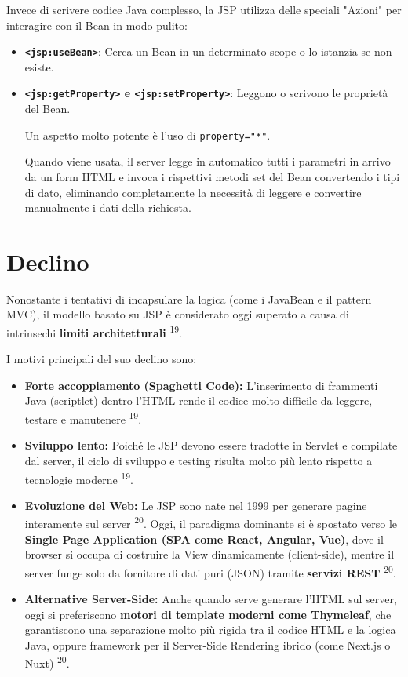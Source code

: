 Invece di scrivere codice Java complesso, la JSP utilizza delle speciali "Azioni" per interagire con il Bean in modo pulito:

\begin{itemize}
    \item \textbf{\texttt{<jsp:useBean>}}: Cerca un Bean in un determinato scope o lo istanzia se non esiste.
    \item \textbf{\texttt{<jsp:getProperty>} e \texttt{<jsp:setProperty>}}: Leggono o scrivono le proprietà del Bean.
    
    Un aspetto molto potente è l'uso di \texttt{property="*"}.
    
    Quando viene usata, il server legge in automatico tutti i parametri in arrivo da un form HTML e invoca i rispettivi metodi set del Bean convertendo i tipi di dato, eliminando completamente la necessità di leggere e convertire manualmente i dati della richiesta.
\end{itemize}

\section{Declino}
Nonostante i tentativi di incapsulare la logica (come i JavaBean e il pattern MVC), il modello basato su JSP è considerato oggi superato a causa di intrinsechi \textbf{limiti architetturali} \textsuperscript{19}.

I motivi principali del suo declino sono:

\begin{itemize}
    \item \textbf{Forte accoppiamento (Spaghetti Code):} 
    L'inserimento di frammenti Java (scriptlet) dentro l'HTML rende il codice molto difficile da leggere, testare e manutenere \textsuperscript{19}.
    \item \textbf{Sviluppo lento:} Poiché le JSP devono essere tradotte in Servlet e compilate dal server, il ciclo di sviluppo e testing risulta molto più lento rispetto a tecnologie moderne \textsuperscript{19}.
    \item \textbf{Evoluzione del Web:} Le JSP sono nate nel 1999 per generare pagine interamente sul server \textsuperscript{20}. Oggi, il paradigma dominante si è spostato verso le \textbf{Single Page Application (SPA come React, Angular, Vue)}, dove il browser si occupa di costruire la View dinamicamente (client-side), mentre il server funge solo da fornitore di dati puri (JSON) tramite \textbf{servizi REST} \textsuperscript{20}.
    \item \textbf{Alternative Server-Side:} Anche quando serve generare l'HTML sul server, oggi si preferiscono \textbf{motori di template moderni come Thymeleaf}, che garantiscono una separazione molto più rigida tra il codice HTML e la logica Java, oppure framework per il Server-Side Rendering ibrido (come Next.js o Nuxt) \textsuperscript{20}.
\end{itemize}